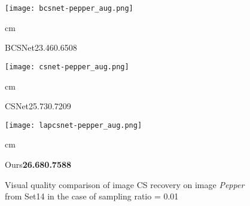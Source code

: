 \documentclass{article}
\begin{document}
\begin{figure*}[tb]
\begin{minipage}[t]{0.12\textwidth}
\begin{scriptsize}
\end{scriptsize}
\end{minipage}
\hfill
\begin{minipage}[t]{0.12\textwidth}
\centering
\texttt{[image: bcsnet-pepper\_aug.png]}
\begin{scriptsize}
\centering
{} cm \begin{tiny}BCSNet23.460.6508\end{tiny}
\end{scriptsize}
\end{minipage}
\hfill
\begin{minipage}[t]{0.12\textwidth}
\centering
\texttt{[image: csnet-pepper\_aug.png]}
\begin{scriptsize}
\centering
{} cm \begin{tiny}CSNet25.730.7209\end{tiny}
\end{scriptsize}
\end{minipage}
\hfill
\begin{minipage}[t]{0.12\textwidth}
\centering
\texttt{[image: lapcsnet-pepper\_aug.png]}
\begin{scriptsize}
\centering
{} cm \begin{tiny}Ours\textbf{26.68}\textbf{0.7588}\end{tiny}
\end{scriptsize}
\label{figure2}
\end{minipage}
\vspace{-0.5em} \caption{Visual quality comparison of image CS recovery on image \emph{Pepper} from Set14 in the case of sampling ratio = 0.01}
\label{figure2}
\end{figure*}
\end{document}
